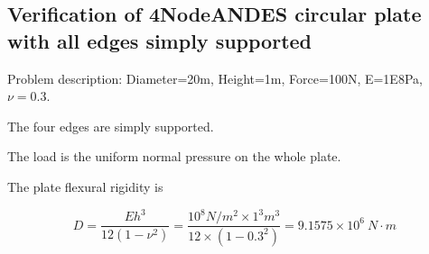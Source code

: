 \documentclass[fleqn,11pt]{article}
\begin{document}






















\newpage
\subsection{Verification of 4NodeANDES circular plate with all edges simply supported}


Problem description: Diameter=20m, Height=1m, Force=100N, E=1E8Pa, $\nu=0.3$. 

The four edges are simply supported. 

The load is the uniform normal pressure on the whole plate. 


The plate flexural rigidity is 

\begin{equation}
  D=\frac{Eh^3}{12(1-\nu^2)}=\frac{10^8 N/m^2 \times 1^3 m^3 }{12 \times (1-0.3^2) }= 9.1575 \times 10^6 \ N\cdot m
\end{equation}
\end{document}

